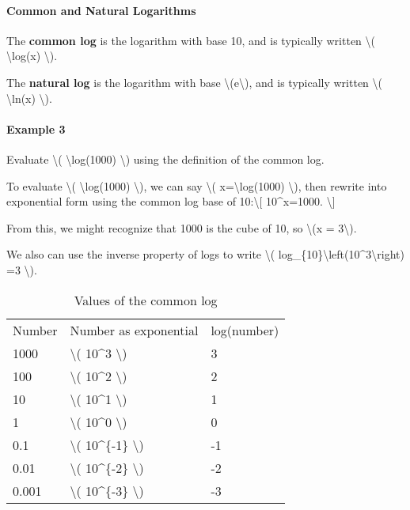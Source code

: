 \hypertarget{common-and-natural-logarithms}{%
\paragraph{Common and Natural
Logarithms}\label{common-and-natural-logarithms}}

The \textbf{common log} is the logarithm with base 10, and is typically
written \textbackslash{}( \textbackslash{}log(x) \textbackslash{}).

The \textbf{natural log} is the logarithm with base
\textbackslash{}(e\textbackslash{}), and is typically written
\textbackslash{}( \textbackslash{}ln(x) \textbackslash{}).

\hypertarget{example-3}{%
\paragraph{Example 3}\label{example-3}}

Evaluate \textbackslash{}( \textbackslash{}log(1000) \textbackslash{})
using the definition of the common log.

To evaluate \textbackslash{}( \textbackslash{}log(1000)
\textbackslash{}), we can say \textbackslash{}(
x=\textbackslash{}log(1000) \textbackslash{}), then rewrite into
exponential form using the common log base of 10:\textbackslash{}{[}
10\^{}x=1000. \textbackslash{}{]}

From this, we might recognize that 1000 is the cube of 10, so
\textbackslash{}(x = 3\textbackslash{}).

We also can use the inverse property of logs to write \textbackslash{}(
log\_\{10\}\textbackslash{}left(10\^{}3\textbackslash{}right) =3
\textbackslash{}).

\begin{longtable}[]{@{}lll@{}}
\caption{Values of the common log}\tabularnewline
\toprule
\endhead
Number & Number as exponential & log(number)\tabularnewline
1000 & \textbackslash{}( 10\^{}3 \textbackslash{}) & 3\tabularnewline
100 & \textbackslash{}( 10\^{}2 \textbackslash{}) & 2\tabularnewline
10 & \textbackslash{}( 10\^{}1 \textbackslash{}) & 1\tabularnewline
1 & \textbackslash{}( 10\^{}0 \textbackslash{}) & 0\tabularnewline
0.1 & \textbackslash{}( 10\^{}\{-1\} \textbackslash{}) &
-1\tabularnewline
0.01 & \textbackslash{}( 10\^{}\{-2\} \textbackslash{}) &
-2\tabularnewline
0.001 & \textbackslash{}( 10\^{}\{-3\} \textbackslash{}) &
-3\tabularnewline
\bottomrule
\end{longtable}

